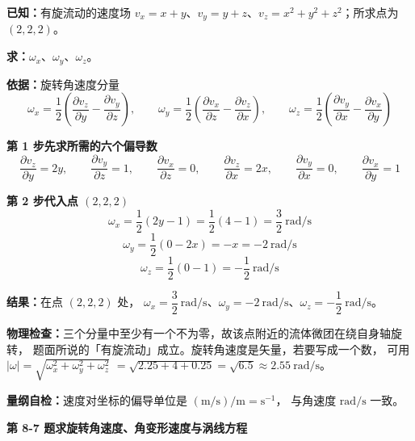 \begin{jie}
\textbf{已知：}有旋流动的速度场 $v_x=x+y$、$v_y=y+z$、$v_z=x^2+y^2+z^2$；所求点为 $(2,2,2)$。

\textbf{求：}$\omega_x$、$\omega_y$、$\omega_z$。

\textbf{依据：}旋转角速度分量
\[ \omega_x=\frac{1}{2}\left(\frac{\partial v_z}{\partial y}-\frac{\partial v_y}{\partial z}\right),\qquad
   \omega_y=\frac{1}{2}\left(\frac{\partial v_x}{\partial z}-\frac{\partial v_z}{\partial x}\right),\qquad
   \omega_z=\frac{1}{2}\left(\frac{\partial v_y}{\partial x}-\frac{\partial v_x}{\partial y}\right) \]

\textbf{第 1 步\quad 先求所需的六个偏导数}
\[ \frac{\partial v_z}{\partial y}=2y,\qquad \frac{\partial v_y}{\partial z}=1,\qquad
   \frac{\partial v_x}{\partial z}=0,\qquad \frac{\partial v_z}{\partial x}=2x,\qquad
   \frac{\partial v_y}{\partial x}=0,\qquad \frac{\partial v_x}{\partial y}=1 \]

\textbf{第 2 步\quad 代入点 $(2,2,2)$}
\[ \omega_x=\frac{1}{2}\left(2y-1\right)=\frac{1}{2}\left(4-1\right)=\frac{3}{2}\ \mathrm{rad/s} \]
\[ \omega_y=\frac{1}{2}\left(0-2x\right)=-x=-2\ \mathrm{rad/s} \]
\[ \omega_z=\frac{1}{2}\left(0-1\right)=-\frac{1}{2}\ \mathrm{rad/s} \]

\textbf{结果：}在点 $(2,2,2)$ 处，
$\omega_x=\dfrac{3}{2}\ \mathrm{rad/s}$、$\omega_y=-2\ \mathrm{rad/s}$、$\omega_z=-\dfrac{1}{2}\ \mathrm{rad/s}$。

\textbf{物理检查：}三个分量中至少有一个不为零，故该点附近的流体微团在绕自身轴旋转，
题面所说的「有旋流动」成立。旋转角速度是矢量，若要写成一个数，
可用 $|\omega|=\sqrt{\omega_x^2+\omega_y^2+\omega_z^2}$
$=\sqrt{2.25+4+0.25}=\sqrt{6.5}\approx2.55\ \mathrm{rad/s}$。

\textbf{量纲自检：}速度对坐标的偏导单位是 $\mathrm{(m/s)/m}=\mathrm{s^{-1}}$，
与角速度 $\mathrm{rad/s}$ 一致。
\end{jie}

\noindent\textbf{第 8-7 题\quad 求旋转角速度、角变形速度与涡线方程}

